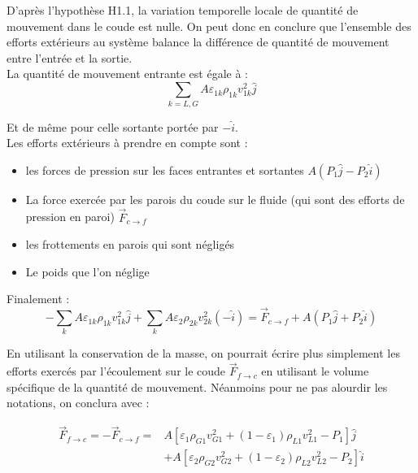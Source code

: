 D'après l'hypothèse H1.1, la variation temporelle locale de quantité de mouvement dans le coude est nulle. On peut donc en conclure que l'ensemble des efforts extérieurs au système balance la différence de quantité de mouvement entre l'entrée et la sortie.\\

La quantité de mouvement entrante est égale à :
\begin{equation}
    \sum_{k=L,G} A\varepsilon_{1k}\rho_{1k} v_{1k}^2 \hat{j}
\end{equation}

Et de même pour celle sortante portée par $-\hat{i}$.\\

Les efforts extérieurs à prendre en compte  sont :

\begin{itemize}
    \item les forces de pression sur les faces entrantes et sortantes $A \left(P_1 \hat{j} - P_2 \hat{i}\right)$
    \item La force exercée par les parois du coude sur le fluide (qui sont des efforts de pression en paroi) $\vec{F}_{c\rightarrow f}$
    \item les frottements en parois qui sont négligés
    \item Le poids que l'on néglige
\end{itemize}

Finalement :
\begin{equation}
    -\sum_k A\varepsilon_{1k}\rho_{1k} v_{1k}^2 \hat{j} + \sum_k A\varepsilon_2\rho_{2k} v_{2k}^2 (-\hat{i}) = \vec{F}_{c\rightarrow f} + A\left( P_1 \hat{j} + P_2 \hat{i} \right) 
\end{equation}

En utilisant la conservation de la masse, on pourrait écrire plus simplement les efforts exercés par l'écoulement sur le coude $\vec{F}_{f\rightarrow c}$ en utilisant le volume spécifique de la quantité de mouvement. Néanmoins pour ne pas alourdir les notations, on conclura avec :

\begin{equation}
\boxed{
\begin{split}
        \vec{F}_{f\rightarrow c} = - \vec{F}_{c \rightarrow f} = & A\left[ \varepsilon_1\rho_{G1}v_{G1}^2 + (1-\varepsilon_1)\rho_{L1}v_{L1}^2 -P_1 \right] \hat{j} \\
          & +  A \left[\varepsilon_2 \rho_{G2}v_{G2}^2 + (1-\varepsilon_2)\rho_{L2}v_{L2}^2  - P_2 \right] \hat{i}
\end{split}
}
\end{equation}
